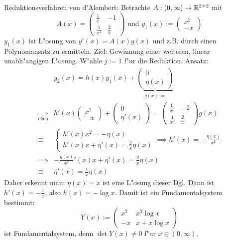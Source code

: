 \example Reduktionsverfahren von d'Alembert:{
  Betrachte $A:(0,\infty)\to\mathbb R^{2\times 2}$ mit
  \[A(x)=\begin{pmatrix}
      \frac 1x & -1 \\ \frac 1 {x^2} & \frac 2 x
      \end{pmatrix}
      \text{ und }
      y_1(x):=\begin{pmatrix}
      x^2\\-x
      \end{pmatrix}
    \]
  $y_1(x)$ ist L"osung von $y'(x)=A(x)y(x)$ und z.B. durch einen Polynomansatz 
  zu ermitteln.
  Ziel: Gewinnung einer weiteren, linear unabh"angigen L"osung.
  W"ahle $j:=1$ f"ur die Reduktion. Ansatz:
  \begin{align*}
    &y_2(x)=h(x)y_1(x)+
    \underbrace{\begin{pmatrix}0\\ \eta(x)\end{pmatrix}}_{g(x):=}\\
    \underset{\text{oben}}\implies &h'(x)\begin{pmatrix}
      x^2\\-x
      \end{pmatrix}+\begin{pmatrix}0\\ \eta'(x)\end{pmatrix}=
      \begin{pmatrix}
      \frac 1x & -1 \\ \frac 1 {x^2} & \frac 2 x
      \end{pmatrix}g(x)\\
    \equiv&\left\{\begin{gathered}
       h'(x)x^2=-\eta(x)\\
       h'(x)x+\eta'(x)=\frac 2 x \eta(x)\end{gathered}\right.
       \implies h'(x)=-\frac{\eta(x)}{x^2}\\
    \implies &-\frac{\eta(x)}{x^2}'(x)x+\eta'(x)=\frac 2 x \eta(x)\\
    \equiv &\eta'(x)=\frac 1 x \eta(x) 
    \end{align*}
  Daher erkennt man: $\eta(x)=x$ ist eine L"osung dieser Dgl.
  Dann ist $h'(x)=-\frac 1 x$, also $h(x)=-\log x$.
  Damit ist ein Fundamentalsystem bestimmt:
  \[
    Y(x):=\begin{pmatrix}
      x^2 & x^2\log x \\
      -x & x+x\log x
      \end{pmatrix}
    \]
  ist Fundamentalsystem, denn $\det Y(x)\neq 0$ f"ur $x\in(0,\infty)$.
}
